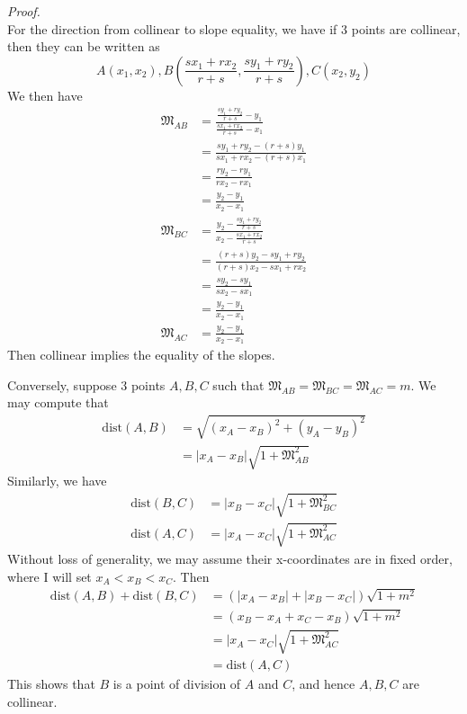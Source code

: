 \documentclass[12pt]{article}
\renewenvironment{proof}[1][Proof]{\begin{snugshade*} \textit{{#1}.}\\}{\hfill \qedsymbol \end{snugshade*}}
\begin{document}
    \begin{proof}
        For the direction from collinear to slope equality, we have if 3 points are collinear, then they can be written as $$A(x_1,x_2), B(\frac{sx_1+rx_2}{r+s}, \frac{sy_1+ry_2}{r+s}), C(x_2,y_2)$$
        We then have \begin{align*}
            \mathfrak{M}_{AB}&=\frac{\frac{sy_1+ry_2}{r+s}-y_1}{\frac{sx_1+rx_2}{r+s}-x_1}\\
            &=\frac{sy_1+ry_2-(r+s)y_1}{sx_1+rx_2-(r+s)x_1}\\
            &=\frac{ry_2-ry_1}{rx_2-rx_1}\\
            &=\frac{y_2-y_1}{x_2-x_1}\\
            \mathfrak{M}_{BC}&=\frac{y_2-\frac{sy_1+ry_2}{r+s}}{x_2-\frac{sx_1+rx_2}{r+s}}\\
            &=\frac{(r+s)y_2-sy_1+ry_2}{(r+s)x_2-sx_1+rx_2}\\
            &=\frac{sy_2-sy_1}{sx_2-sx_1}\\
            &=\frac{y_2-y_1}{x_2-x_1}\\
            \mathfrak{M}_{AC}&=\frac{y_2-y_1}{x_2-x_1}
        \end{align*}
        Then collinear implies the equality of the slopes.

        Conversely, suppose 3 points $A,B,C$ such that $\mathfrak{M}_{AB}=\mathfrak{M}_{BC}=\mathfrak{M}_{AC}=m$. We may compute that \begin{align*}
            \mathrm{dist}(A,B)&=\sqrt{(x_A-x_B)^2+(y_A-y_B)^2}\\
            &=|x_A-x_B|\sqrt{1+\mathfrak{M}_{AB}^2}
        \end{align*}
        Similarly, we have \begin{align*}
            \mathrm{dist}(B,C)&=|x_B-x_C|\sqrt{1+\mathfrak{M}_{BC}^2}\\
            \mathrm{dist}(A,C)&=|x_A-x_C|\sqrt{1+\mathfrak{M}_{AC}^2}
        \end{align*}
        Without loss of generality, we may assume their x-coordinates are in fixed order, where I will set $x_A<x_B<x_C$. Then \begin{align*}
            \mathrm{dist}(A,B)+\mathrm{dist}(B,C)&=(|x_A-x_B|+|x_B-x_C|)\sqrt{1+m^2}\\
            &=(x_B-x_A+x_C-x_B)\sqrt{1+m^2}\\
            &=|x_A-x_C|\sqrt{1+\mathfrak{M}_{AC}^2}\\
            &=\mathrm{dist}(A,C)
        \end{align*}
        This shows that $B$ is a point of division of $A$ and $C$, and hence $A,B,C$ are collinear.
    \end{proof}
\end{document}
